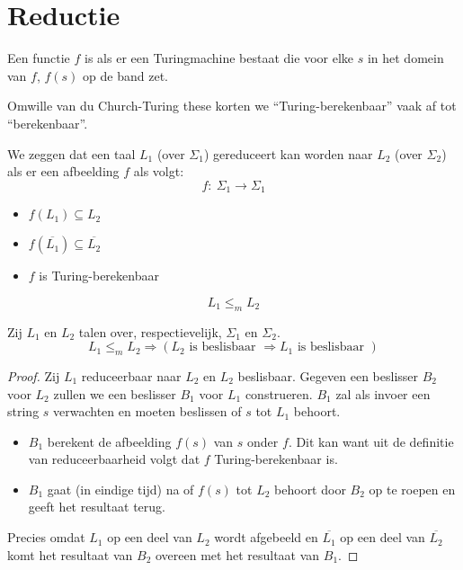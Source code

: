 \documentclass[main.tex]{subfiles}
\begin{document}

\section{Reductie}
\label{sec:reductie}

\begin{de}
  Een functie $f$ is  als er een Turingmachine bestaat die voor elke $s$ in het domein van $f$, $f(s)$ op de band zet.
\end{de}

\begin{de}
  Omwille van du Church-Turing these korten we ``Turing-berekenbaar'' vaak af tot ``berekenbaar''.
\end{de}

\begin{de}
  We zeggen dat een taal $L_1$ (over $\Sigma_1$) gereduceert kan worden naar $L_2$ (over $\Sigma_2$) als er een afbeelding $f$ als volgt:
  \[  f:\ \Sigma_1\rightarrow \Sigma_1  \]
  \begin{itemize}
    \item $f(L_1) \subseteq L_2$
    \item $f(\overline{L_1}) \subseteq \overline{L_2}$
    \item $f$ is Turing-berekenbaar
  \end{itemize}
  \[ L_1\le_m L_2 \]
\end{de}

\begin{st}
  Zij $L_1$ en $L_2$ talen over, respectievelijk, $\Sigma_1$ en $\Sigma_2$.
  \[ L_1\le_m L_2 \Rightarrow (L_2 \text{ is beslisbaar } \Rightarrow L_1 \text{ is beslisbaar }) \]

  \begin{proof}
    Zij $L_{1}$ reduceerbaar naar $L_{2}$ en $L_{2}$ beslisbaar.
    Gegeven een beslisser $B_{2}$ voor $L_{2}$ zullen we een beslisser $B_{1}$ voor $L_{1}$ construeren.
    $B_{1}$ zal als invoer een string $s$ verwachten en moeten beslissen of $s$ tot $L_{1}$ behoort.
    \begin{itemize}
    \item $B_{1}$ berekent de afbeelding $f(s)$ van $s$ onder $f$.
      Dit kan want uit de definitie van reduceerbaarheid volgt dat $f$ Turing-berekenbaar is.
    \item $B_{1}$ gaat (in eindige tijd) na of $f(s)$ tot $L_{2}$ behoort door $B_{2}$ op te roepen en geeft het resultaat terug.
    \end{itemize}
    Precies omdat $L_{1}$ op een deel van $L_{2}$ wordt afgebeeld en $\overline{L_{1}}$ op een deel van $\overline{L_{2}}$ komt het resultaat van $B_{2}$ overeen met het resultaat van $B_{1}$.
  \end{proof}
\end{st}
\end{document}
